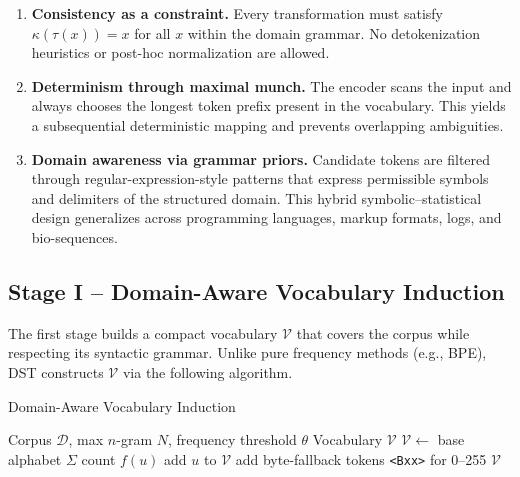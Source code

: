 \begin{enumerate}
  \item \textbf{Consistency as a constraint.}
        Every transformation must satisfy
        $\kappa(\tau(x))\!=\!x$ for all $x$
        within the domain grammar. No detokenization heuristics
        or post-hoc normalization are allowed.

  \item \textbf{Determinism through maximal munch.}
        The encoder scans the input and always chooses
        the longest token prefix present in the vocabulary.
        This yields a subsequential deterministic mapping
        and prevents overlapping ambiguities.

  \item \textbf{Domain awareness via grammar priors.}
        Candidate tokens are filtered through
        regular-expression-style patterns that express
        permissible symbols and delimiters
        of the structured domain.
        This hybrid symbolic–statistical design
        generalizes across programming languages,
        markup formats, logs, and bio-sequences.
\end{enumerate}

\subsection{Stage I – Domain-Aware Vocabulary Induction}
\label{sec:method-vocab}

The first stage builds a compact vocabulary $\mathcal{V}$
that covers the corpus while respecting its syntactic grammar.
Unlike pure frequency methods (e.g., BPE),
DST constructs $\mathcal{V}$ via the following algorithm.

\begin{algorithm}[H]
\caption{Domain-Aware Vocabulary Induction}
\label{alg:vocab}
\begin{algorithmic}[1]
\REQUIRE Corpus $\mathcal{D}$, max $n$-gram $N$, frequency threshold $\theta$
\ENSURE Vocabulary $\mathcal{V}$
\STATE $\mathcal{V}\!\leftarrow$ base alphabet $\Sigma$
      \STATE count $f(u)$
    \ENDFOR
  \ENDFOR
\ENDFOR
{}
  \STATE add $u$ to $\mathcal{V}$
\ENDFOR
\STATE add byte-fallback tokens \texttt{<Bxx>} for 0–255
\RETURN $\mathcal{V}$
\end{algorithmic}
\end{algorithm}

